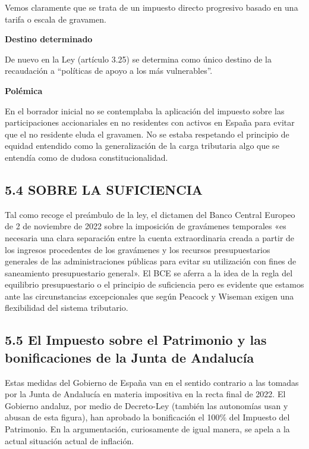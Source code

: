 \documentclass[
]{article}
\begin{document}
Vemos claramente que se trata de un impuesto directo progresivo basado
en una tarifa o escala de gravamen.

\textbf{Destino determinado}

De nuevo en la Ley (artículo 3.25) se determina como único destino de la
recaudación a ``políticas de apoyo a los más vulnerables''.

\textbf{Polémica}

En el borrador inicial no se contemplaba la aplicación del impuesto
sobre las participaciones accionariales en no residentes con activos en
España para evitar que el no residente eluda el gravamen. No se estaba
respetando el principio de equidad entendido como la generalización de
la carga tributaria algo que se entendía como de dudosa
constitucionalidad.

\hypertarget{sobre-la-suficiencia}{%
\subsection*{5.4 SOBRE LA SUFICIENCIA}\label{sobre-la-suficiencia}}

Tal como recoge el preámbulo de la ley, el dictamen del Banco Central
Europeo de 2 de noviembre de 2022 sobre la imposición de gravámenes
temporales «es necesaria una clara separación entre la cuenta
extraordinaria creada a partir de los ingresos procedentes de los
gravámenes y los recursos presupuestarios generales de las
administraciones públicas para evitar su utilización con fines de
saneamiento presupuestario general». El BCE se aferra a la idea de la
regla del equilibrio presupuestario o el principio de suficiencia pero
es evidente que estamos ante las circunstancias excepcionales que según
Peacock y Wiseman exigen una flexibilidad del sistema tributario.

\hypertarget{el-impuesto-sobre-el-patrimonio-y-las-bonificaciones-de-la-junta-de-andalucuxeda}{%
\subsection{5.5 El Impuesto sobre el Patrimonio y las bonificaciones de
la Junta de
Andalucía}\label{el-impuesto-sobre-el-patrimonio-y-las-bonificaciones-de-la-junta-de-andalucuxeda}}

Estas medidas del Gobierno de España van en el sentido contrario a las
tomadas por la Junta de Andalucía en materia impositiva en la recta
final de 2022. El Gobierno andaluz, por medio de Decreto-Ley (también
las autonomías usan y abusan de esta figura), han aprobado la
bonificación el 100\% del Impuesto del Patrimonio. En la argumentación,
curiosamente de igual manera, se apela a la actual situación actual de
inflación.
\end{document}
